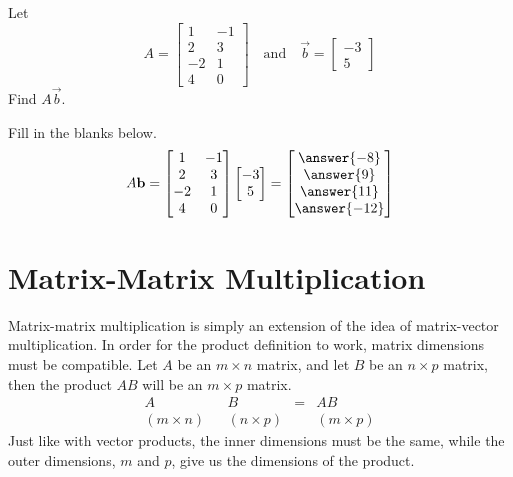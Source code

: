 \documentclass{ximera}
\begin{document}
\begin{example}
Let $$A=\begin{bmatrix}1&-1\\2&3\\-2&1\\4&0\end{bmatrix}\quad\text{and}\quad\vec{b}=\begin{bmatrix}-3\\5\end{bmatrix}
$$
Find $A\vec{b}$.
\begin{explanation}
Fill in the blanks below.  
$$A\vec{b}=\begin{bmatrix}1&-1\\2&3\\-2&1\\4&0\end{bmatrix}\begin{bmatrix}-3\\5\end{bmatrix}=\begin{bmatrix}\answer{-8}\\\answer{9}\\\answer{11}\\\answer{-12}\end{bmatrix}
$$
\end{explanation}
\end{example}

\section*{Matrix-Matrix Multiplication}

Matrix-matrix multiplication is simply an extension of the idea of matrix-vector multiplication.  In order for the product definition to work, matrix dimensions must be compatible.  Let $A$ be an $m\times n$ matrix, and let $B$ be an $n\times p$ matrix, then the product $AB$ will be an $m\times p$ matrix.
$$\begin{array}{ccccc}
A& & B &=& AB\\
(m\times n) & &(n\times p) & &(m\times p)
\end{array}$$
Just like with vector products, the inner dimensions must be the same, while the outer dimensions, $m$ and $p$, give us the dimensions of the product.
\end{document}
